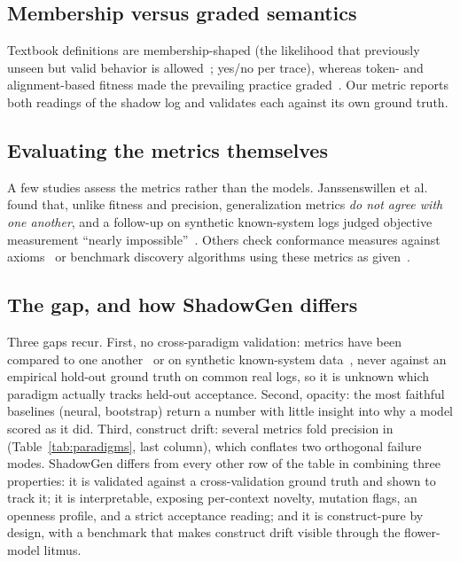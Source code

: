 \documentclass[runningheads]{llncs}
\begin{document}
\subsection{Membership versus graded semantics}
Textbook definitions are membership-shaped (the likelihood that previously unseen but valid behavior is allowed~\cite{vanderaalst2016pm}; yes/no per trace), whereas token- and alignment-based fitness made the prevailing practice graded~\cite{rozinat2008conformance}. Our metric reports both readings of the shadow log and validates each against its own ground truth.

\subsection{Evaluating the metrics themselves}
A few studies assess the metrics rather than the models. Janssenswillen et al.~\cite{janssenswillen2017comparative} found that, unlike fitness and precision, generalization metrics \emph{do not agree with one another}, and a follow-up on synthetic known-system logs judged objective measurement ``nearly impossible''~\cite{janssenswillen2019confirmatory}. Others check conformance measures against axioms~\cite{vanderaalst2018propositions,syring2019conformance} or benchmark discovery algorithms using these metrics as given~\cite{augusto2019benchmark}.

\subsection{The gap, and how ShadowGen differs}
Three gaps recur. First, no cross-paradigm validation: metrics have been compared to one another~\cite{janssenswillen2017comparative} or on synthetic known-system data~\cite{janssenswillen2019confirmatory}, never against an empirical hold-out ground truth on common real logs, so it is unknown which paradigm actually tracks held-out acceptance. Second, opacity: the most faithful baselines (neural, bootstrap) return a number with little insight into why a model scored as it did. Third, construct drift: several metrics fold precision in (Table~\ref{tab:paradigms}, last column), which conflates two orthogonal failure modes. ShadowGen differs from every other row of the table in combining three properties: it is validated against a cross-validation ground truth and shown to track it; it is interpretable, exposing per-context novelty, mutation flags, an openness profile, and a strict acceptance reading; and it is construct-pure by design, with a benchmark that makes construct drift visible through the flower-model litmus.
\end{document}
